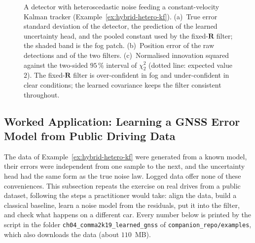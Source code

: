 \documentclass[graybox,envcountchap]{style/SNmono}
\newcommand{\repopath}[1]{\texttt{#1}}
\begin{document}
\begin{figure}[!t]
{
}
\caption{A detector with heteroscedastic noise feeding a constant-velocity Kalman tracker (Example~\ref{ex:hybrid-hetero-kf}). (a)~True error standard deviation of the detector, the prediction of the learned uncertainty head, and the pooled constant used by the fixed-$\mathbf{R}$ filter; the shaded band is the fog patch. (b)~Position error of the raw detections and of the two filters. (c)~Normalised innovation squared against the two-sided $95\,\%$ interval of $\chi^{2}_{2}$ (dotted line: expected value $2$). The fixed-$\mathbf{R}$ filter is over-confident in fog and under-confident in clear conditions; the learned covariance keeps the filter consistent throughout.}
\label{fig:hybrid-hetero-kf}
\end{figure}

\subsection{Worked Application: Learning a GNSS Error Model from Public Driving Data}
\label{subsec:c2k-application}
The data of Example~\ref{ex:hybrid-hetero-kf} were generated from a known model, their errors were independent from one sample to the next, and the uncertainty head had the same form as the true noise law. Logged data offer none of these conveniences. This subsection repeats the exercise on real drives from a public dataset, following the steps a practitioner would take: align the data, build a classical baseline, learn a noise model from the residuals, put it into the filter, and check what happens on a different car. Every number below is printed by the script in the folder \repopath{ch04\_\allowbreak comma2k19\_\allowbreak learned\_\allowbreak gnss} of \repopath{companion\_\allowbreak repo/\allowbreak examples}, which also downloads the data (about $110$~MB).
\end{document}
